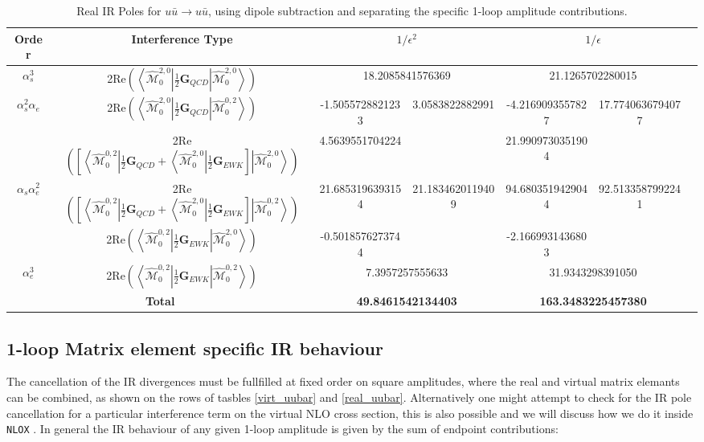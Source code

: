 \documentclass[a4paper]{article}
\def \NLOX{\texttt{NLOX} }
\def \MBra#1#2#3{\left<\hat{\mathcal{M}}_{#1}^{#2,#3}\right|}
\def \MKet#1#2#3{\left|\hat{\mathcal{M}}_{#1}^{#2,#3}\right>}
\begin{document}
\begin{table}[]
\footnotesize
{}
\vskip0.75cm
\begin{tabular}{|c|c|c|c|c|c|c}\hline
 Order& Interference Type
 & \multicolumn{2}{c}{$1/\epsilon^{2}$} 
 & \multicolumn{2}{|c|}{$1/\epsilon$}\\\hline
 $\alpha_s^3$                           
 & 2Re$\left(\MBra{0}{2}{0}\frac{1}{2}\textbf{G}_{QCD}\MKet{0}{2}{0}\right)$
 & \multicolumn{2}{c|}{18.2085841576369} 
 & \multicolumn{2}{c|}{21.1265702280015} \\\hline
 \multirow{2}{*}{$\alpha_s^2\alpha_e$}                                                        
 & 2Re$\left(\MBra{0}{2}{0}\frac{1}{2}\textbf{G}_{QCD}\MKet{0}{0}{2}\right)$
 & -1.5055728821233 & \multirow{2}{*}{3.0583822882991} 
 & -4.2169093557827 & \multirow{2}{*}{17.7740636794077} \\
 & 2Re$
 \left(\left[
 \MBra{0}{0}{2}\frac{1}{2}\textbf{G}_{QCD}
 +
 \MBra{0}{2}{0}\frac{1}{2}\textbf{G}_{EWK}
 \right]
 \MKet{0}{2}{0}\right)$
 & 4.5639551704224 && 21.9909730351904 &\\\hline
 \multirow{2}{*}{$\alpha_s\alpha_e^2$}                                                  
 & 2Re$
 \left(\left[
 \MBra{0}{0}{2}\frac{1}{2}\textbf{G}_{QCD}
 +
 \MBra{0}{2}{0}\frac{1}{2}\textbf{G}_{EWK}
 \right]
 \MKet{0}{0}{2}\right)$
 & 21.6853196393154 & \multirow{2}{*}{21.1834620119409} 
 & 94.6803519429044 & \multirow{2}{*}{92.5133587992241} \\
 & 2Re$\left(\MBra{0}{0}{2}\frac{1}{2}\textbf{G}_{EWK}\MKet{0}{2}{0}\right)$
 & -0.5018576273744 && -2.1669931436803 &\\\hline
 $\alpha_e^3$                                                                             
 & 2Re$\left(\MBra{0}{0}{2}\frac{1}{2}\textbf{G}_{EWK}\MKet{0}{0}{2}\right)$
 & \multicolumn{2}{c|}{7.3957257555633} 
 & \multicolumn{2}{c|}{31.9343298391050} \\\hline
   \multicolumn{2}{|c|}{\textbf{Total}}     
 & \multicolumn{2}{c|}{\textbf{49.8461542134403}} 
 & \multicolumn{2}{c|}{\textbf{163.3483225457380}}\\\hline
 \end{tabular}
 \caption{Real IR Poles for $u\bar u\rightarrow u\bar u$, using dipole subtraction and separating the 
 specific 1-loop amplitude contributions.}
 \label{1loop_disentangled}
\end{table}
\restoregeometry

\subsection{1-loop Matrix element specific IR behaviour}
The cancellation of the IR divergences must be fullfilled at fixed order on square amplitudes,
where the real and virtual matrix elemants can be combined, as shown on the rows of tasbles \ref{virt_uubar}
and \ref{real_uubar}. Alternatively one might attempt to check for the IR pole cancellation 
for a particular interference term on the virtual NLO cross section, this is also possible and 
we will discuss how we do it inside \NLOX. In general the IR behaviour of any given 1-loop amplitude 
is given by the sum of endpoint contributions:
\end{document}
